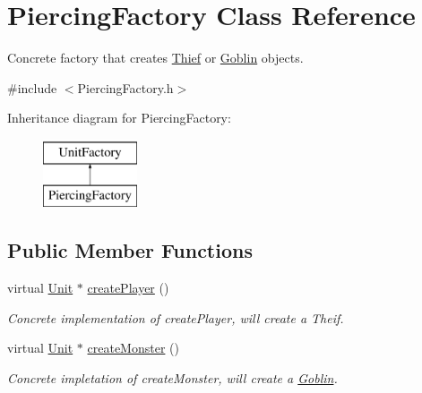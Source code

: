 \hypertarget{class_piercing_factory}{}\section{Piercing\+Factory Class Reference}
\label{class_piercing_factory}


Concrete factory that creates \hyperlink{class_thief}{Thief} or \hyperlink{class_goblin}{Goblin} objects.  




{\ttfamily \#include $<$Piercing\+Factory.\+h$>$}

Inheritance diagram for Piercing\+Factory\+:\begin{figure}[H]
\begin{center}
\leavevmode
\includegraphics[height=2.000000cm]{class_piercing_factory}
\end{center}
\end{figure}
\subsection*{Public Member Functions}
\begin{DoxyCompactItemize}
\item 
\hypertarget{class_piercing_factory_a3a2f3736e85a5c4b0ad0160b1b34d796}{}virtual \hyperlink{class_unit}{Unit} $\ast$ \hyperlink{class_piercing_factory_a3a2f3736e85a5c4b0ad0160b1b34d796}{create\+Player} ()\label{class_piercing_factory_a3a2f3736e85a5c4b0ad0160b1b34d796}

\begin{DoxyCompactList}\small\item\em Concrete implementation of create\+Player, will create a Theif. \end{DoxyCompactList}\item 
\hypertarget{class_piercing_factory_a042235a24b114b8b66e3e7733109e504}{}virtual \hyperlink{class_unit}{Unit} $\ast$ \hyperlink{class_piercing_factory_a042235a24b114b8b66e3e7733109e504}{create\+Monster} ()\label{class_piercing_factory_a042235a24b114b8b66e3e7733109e504}

\begin{DoxyCompactList}\small\item\em Concrete impletation of create\+Monster, will create a \hyperlink{class_goblin}{Goblin}. \end{DoxyCompactList}\end{DoxyCompactItemize}

